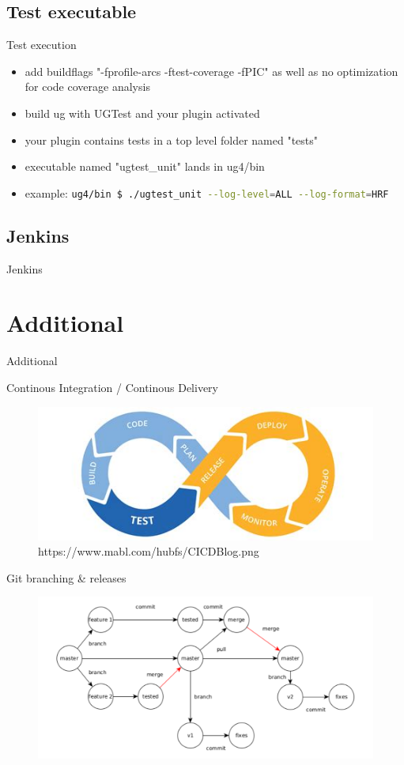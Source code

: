 \documentclass{beamer}
\newcommand{\sectiontitle}[1]{
    \section{#1}
    \begin{frame}
        \centering
        \Huge{#1}
    \end{frame}
}
\newcommand{\subsectiontitle}[1]{
    \subsection{#1}
    \begin{frame}
        \LARGE{#1}
    \end{frame}
}
\begin{document}
        \subsection{Test executable}
        \begin{frame}{Test execution}
            \begin{itemize}
                \item add buildflags "-fprofile-arcs -ftest-coverage -fPIC" as well as no optimization for code coverage analysis
                \item build ug with UGTest and your plugin activated
                \item your plugin contains tests in a top level folder named "tests"
                \item executable named "ugtest\_unit" lands in ug4/bin
                \item example: \lstinline[language=bash]{ug4/bin $ ./ugtest_unit --log-level=ALL --log-format=HRF}
            \end{itemize}
        \end{frame}
        
        \subsectiontitle{Jenkins}

    \sectiontitle{Additional}
    \begin{frame}{Continous Integration / Continous Delivery}
        \centering
        \begin{figure}
            \includegraphics[width=12cm]{./images/cicd.jpeg}
            \caption{https://www.mabl.com/hubfs/CICDBlog.png}
        \end{figure}
    \end{frame}

    \begin{frame}[plain]{Git branching \& releases}
        \centering
        \begin{figure}
            \includegraphics[width=12cm]{images/branching.pdf} 
        \end{figure}
    \end{frame}
   
\end{document}
